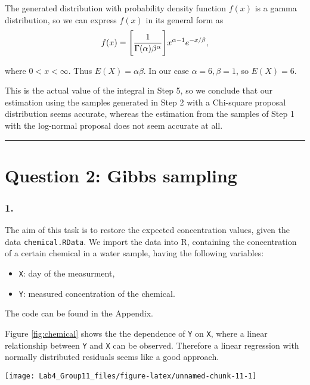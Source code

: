 \documentclass[]{article}
\providecommand{\tightlist}{%
  \setlength{\itemsep}{0pt}\setlength{\parskip}{0pt}}
\let\origfigure\figure
\let\endorigfigure\endfigure
\renewenvironment{figure}[1][2] {
    \expandafter\origfigure\expandafter[H]
} {
    \endorigfigure
}
\begin{document}
The generated distribution with probability density function \(f(x)\) is
a gamma distribution, so we can express \(f(x)\) in its general form as
\[f(x) = \Bigg{[}\frac{1}{\Gamma(\alpha)\beta^\alpha}\Bigg{]}x^{\alpha-1}e^{-x/\beta},\]

where \(0<x<\infty\). Thus \(E(X) = \alpha\beta\). In our case
\(\alpha = 6, \beta=1\), so \(E(X) = 6\).

This is the actual value of the integral in Step 5, so we conclude that
our estimation using the samples generated in Step 2 with a Chi-square
proposal distribution seems accurate, whereas the estimation from the
samples of Step 1 with the log-normal proposal does not seem accurate at
all.

\begin{center}\rule{0.5\linewidth}{\linethickness}\end{center}

\hypertarget{question-2-gibbs-sampling}{%
\section{Question 2: Gibbs sampling}\label{question-2-gibbs-sampling}}

\hypertarget{section-6}{%
\subsubsection{1.}\label{section-6}}

The aim of this task is to restore the expected concentration values,
given the data \texttt{chemical.RData}. We import the data into R,
containing the concentration of a certain chemical in a water sample,
having the following variables:

\begin{itemize}
\tightlist
\item
  \texttt{X}: day of the measurment,
\item
  \texttt{Y}: measured concentration of the chemical.
\end{itemize}

The code can be found in the Appendix.

Figure \ref{fig:chemical} shows the the dependence of \texttt{Y} on
\texttt{X}, where a linear relationship between \texttt{Y} and
\texttt{X} can be observed. Therefore a linear regression with normally
distributed residuals seems like a good approach.

\begin{figure}[h]

{\centering \texttt{[image: Lab4\_Group11\_files/figure-latex/unnamed-chunk-11-1]} 

}

\caption{\label{fig:chemical} Dependendence of measured concentration of the chemical on day of the measurment}\label{fig:unnamed-chunk-11}
\end{figure}
\end{document}
